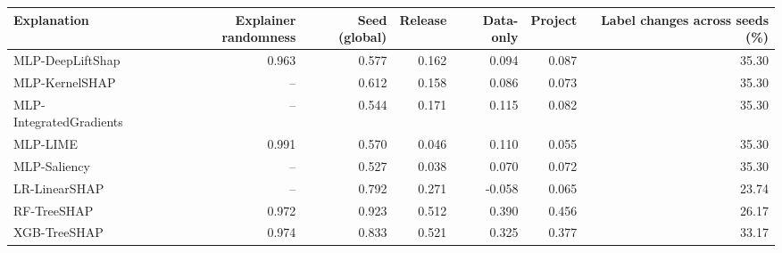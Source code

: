 \small
\begin{tabular}{lrrrrrr}
\toprule
Explanation & Explainer randomness & Seed (global) & Release & Data-only & Project & Label changes across seeds (\%) \\
\midrule
MLP-DeepLiftShap & 0.963 & 0.577 & 0.162 & 0.094 & 0.087 & 35.30 \\
MLP-KernelSHAP & -- & 0.612 & 0.158 & 0.086 & 0.073 & 35.30 \\
MLP-IntegratedGradients & -- & 0.544 & 0.171 & 0.115 & 0.082 & 35.30 \\
MLP-LIME & 0.991 & 0.570 & 0.046 & 0.110 & 0.055 & 35.30 \\
MLP-Saliency & -- & 0.527 & 0.038 & 0.070 & 0.072 & 35.30 \\
LR-LinearSHAP & -- & 0.792 & 0.271 & -0.058 & 0.065 & 23.74 \\
RF-TreeSHAP & 0.972 & 0.923 & 0.512 & 0.390 & 0.456 & 26.17 \\
XGB-TreeSHAP & 0.974 & 0.833 & 0.521 & 0.325 & 0.377 & 33.17 \\
\bottomrule
\end{tabular}
